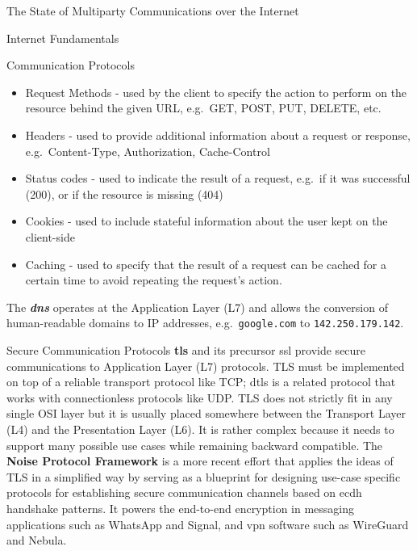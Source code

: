 \begin{frame}[fragile]{The State of Multiparty Communications over the
Internet}
\begin{block}{Internet Fundamentals}
\begin{block}{Communication Protocols}
\begin{itemize}
\tightlist
\item
  Request Methods - used by the client to specify the action to perform
  on the resource behind the given URL, e.g.~GET, POST, PUT, DELETE,
  etc.
\item
  Headers - used to provide additional information about a request or
  response, e.g.~Content-Type, Authorization, Cache-Control
\item
  Status codes - used to indicate the result of a request, e.g.~if it
  was successful (200), or if the resource is missing (404)
\item
  Cookies - used to include stateful information about the user kept on
  the client-side
\item
  Caching - used to specify that the result of a request can be cached
  for a certain time to avoid repeating the request's action.
\end{itemize}

The \textbf{\emph{\gls{dns}}} operates at the Application Layer (L7) and
allows the conversion of human-readable domains to IP addresses,
e.g.~\texttt{google.com} to \texttt{142.250.179.142}.
\end{block}

\begin{block}{Secure Communication Protocols}
\protect\hypertarget{secure-communication-protocols}{}
\textbf{\acrfull{tls}} \autocite{tlsRFC} and its precursor \gls{ssl}
provide secure communications to Application Layer (L7) protocols. TLS
must be implemented on top of a reliable transport protocol like TCP;
\gls{dtls} is a related protocol that works with connectionless
protocols like UDP. TLS does not strictly fit in any single OSI layer
but it is usually placed somewhere between the Transport Layer (L4) and
the Presentation Layer (L6). It is rather complex because it needs to
support many possible use cases while remaining backward compatible.
 
The \textbf{Noise Protocol Framework} \autocite{noiseDocs}
 is a more 
 recent effort that applies the
ideas of TLS in a simplified way by serving as a blueprint for designing
use-case specific protocols for establishing secure communication
channels based on \gls{ecdh} handshake patterns. It powers the
end-to-end encryption in messaging applications such as WhatsApp and
Signal, and \gls{vpn} software such as WireGuard and Nebula.


\end{block}
\end{block}
\end{frame}
